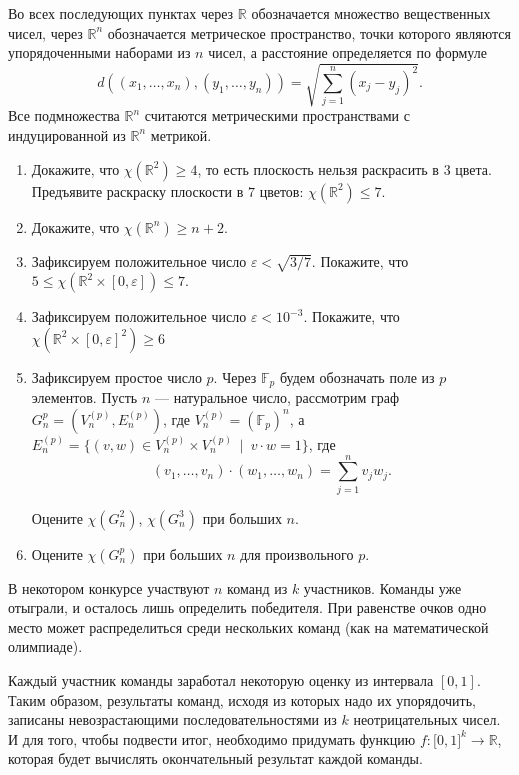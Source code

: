 Во всех последующих пунктах через $\mathbb R$ обозначается множество вещественных чисел, через $\mathbb R^n$ обозначается метрическое пространство, точки которого являются упорядоченными наборами из $n$ чисел, а расстояние определяется по формуле
$$
d((x_1,\dots,x_n), (y_1,\dots,y_n)) =\sqrt{ \sum\limits_{j = 1}^n(x_j-y_j)^2}.
$$
Все подмножества $\mathbb R^n$ считаются метрическими пространствами с индуцированной из $\mathbb R^n$ метрикой.

\begin{enumerate}

\item Докажите, что $\chi(\mathbb R^2)\geq 4$, то есть плоскость нельзя раскрасить в $3$ цвета. Предъявите раскраску плоскости в $7$ цветов: $\chi(\mathbb R^2)\leq 7$.

\item Докажите, что $\chi(\mathbb R^n)\geq n+2$.

\item Зафиксируем положительное число $\varepsilon < \sqrt{3/7}$. Покажите, что $5\leq \chi(\mathbb R^2\times [0,\varepsilon])\leq 7$.

\item Зафиксируем положительное число $\varepsilon < 10^{-3}$. Покажите, что $\chi(\mathbb R^2\times [0,\varepsilon]^2)\geq 6$

\item Зафиксируем простое число $p$. Через $\mathbb F_p$ будем обозначать поле из $p$ элементов. Пусть $n$ --- натуральное число, рассмотрим граф $G^p_n = (V^{(p)}_n,E^{(p)}_n)$, где $V^{(p)}_n = (\mathbb F_p)^n$, а $E^{(p)}_n = \{(v,w)\in V_n^{(p)}\times V^{(p)}_n\ \mid\ v\cdot w = 1\}$, где
$$
(v_1,\dots,v_n)\cdot(w_1,\dots,w_n) = \sum\limits_{j = 1}^nv_jw_j.
$$

 Оцените $\chi(G^2_n)$, $\chi(G^3_n)$ при больших $n$.


\item Оцените $\chi(G^p_n)$ при больших $n$ для произвольного $p$.

\end{enumerate}



В некотором конкурсе участвуют $n$ команд из $k$ участников. Команды уже отыграли, и осталось лишь определить победителя. При равенстве очков одно место может распределиться среди нескольких команд (как на математической олимпиаде).

Каждый участник команды заработал некоторую оценку из интервала $[0,1]$. Таким образом, результаты команд, исходя из которых надо их упорядочить, записаны невозрастающими последовательностями из $k$ неотрицательных чисел. И для того, чтобы подвести итог, необходимо придумать функцию $f: \mathbb [0,1]^k\to \mathbb R$, которая будет вычислять окончательный результат каждой команды.

